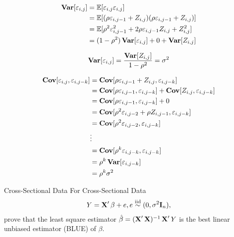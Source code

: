 \documentclass[UTF8,a4paper,10pt]{article}
\begin{document}
  \begin{solution}

    \begin{equation*}
      \begin{aligned}
        \operatorname{\textbf{Var}}[\varepsilon_{i,j}] &= \operatorname{\mathbb{E}}[\varepsilon_{i,j}\varepsilon_{i,j} ]\\
        &= \operatorname{\mathbb{E}}[(\rho \varepsilon_{i,j-1}+Z_{i,j})(\rho \varepsilon_{i,j-1}+Z_{i,j})]\\
        &=\operatorname{\mathbb{E}}[\rho^2 \varepsilon_{i,j-1}^2 + 2\rho \varepsilon_{i,j-1}Z_{i,j} + Z_{i,j}^2]\\
        &=(1-\rho^2)\operatorname{\textbf{Var}}[\varepsilon_{i,j}] + 0 + \operatorname{\textbf{Var}}[Z_{i,j}]
      \end{aligned}
    \end{equation*}    
    
    \begin{equation*}
      \begin{aligned}
        \operatorname{\textbf{Var}}[\varepsilon_{i,j}] = \frac{\operatorname{\textbf{Var}}[Z_{i,j}]}{1-\rho^2} = \sigma^2
      \end{aligned}
    \end{equation*}

    \begin{equation*}
      \begin{aligned}
        \operatorname{\textbf{Cov}}[\varepsilon_{i,j},\varepsilon_{i,j-k}] &= \operatorname{\textbf{Cov}}[\rho \varepsilon_{i,j-1}+Z_{i,j},\varepsilon_{i,j-k}]\\
        & =\operatorname{\textbf{Cov}}[\rho \varepsilon_{i,j-1},\varepsilon_{i,j-k}]+\operatorname{\textbf{Cov}}[Z_{i,j},\varepsilon_{i,j-k}]\\
        & =\operatorname{\textbf{Cov}}[\rho \varepsilon_{i,j-1},\varepsilon_{i,j-k}] + 0\\
        & =\operatorname{\textbf{Cov}}[\rho^2 \varepsilon_{i,j-2} +\rho Z_{i,j-1},\varepsilon_{i,j-k}]\\
        & =\operatorname{\textbf{Cov}}[\rho^2 \varepsilon_{i,j-2},\varepsilon_{i,j-k}]\\
        &\vdots\\
        &=\operatorname{\textbf{Cov}}[\rho^k \varepsilon_{i,j-k},\varepsilon_{i,j-k}]\\
        &=\rho^k\operatorname{\textbf{Var}}[\varepsilon_{i,j-k}]\\
        &=\rho^k\sigma^2
      \end{aligned}
    \end{equation*}


  \end{solution}
\pagebreak


  \begin{Problem}[]{Cross-Sectional Data}
    For Cross-Sectional Data
    \begin{equation*}
      \begin{aligned}
        Y = \operatorname{\mathbf{X}}'\beta + e, e \overset{\text{iid}}{\sim } (0,\sigma^2\mathbf{I}_n),
      \end{aligned}
    \end{equation*}
    prove that the least square estimator \(\hat{\beta} = (\operatorname{\mathbf{X}}'\operatorname{\mathbf{X}})^{-1}\operatorname{\mathbf{X}}'Y\) is the best linear unbiased estimator (BLUE) of \(\beta\).
    
      \end{Problem} 
\end{document}
